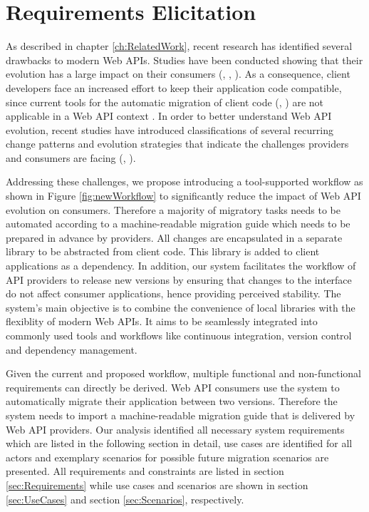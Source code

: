 \chapter{Requirements Elicitation}
\label{ch:RequirementsElicitation}

As described in chapter \ref{ch:RelatedWork}, recent research has identified several drawbacks to modern Web APIs. Studies have been conducted showing that their evolution has a large impact on their consumers (\cite{brito_you_2020}, \cite{xavier_historical_2017}, \cite{espinha_web_2014}). As a consequence, client developers face an increased effort to keep their application code compatible, since current tools for the automatic migration of client code (\cite{henkel_catchup!_2005}, \cite{hutchison_automated_2006}) are not applicable in a Web API context \cite{li_how_2013}. In order to better understand Web API evolution, recent studies have introduced classifications of several recurring change patterns and evolution strategies that indicate the challenges providers and consumers are facing (\cite{li_how_2013}, \cite{lubke_interface_2019}). 

Addressing these challenges, we propose introducing a tool-supported workflow as shown in Figure \ref{fig:newWorkflow} to significantly reduce the impact of Web API evolution on consumers. Therefore a majority of migratory tasks needs to be automated according to a machine-readable migration guide which needs to be prepared in advance by providers. All changes are encapsulated in a separate library to be abstracted from client code. This library is added to client applications as a dependency. In addition, our system facilitates the workflow of API providers to release new versions by ensuring that changes to the interface do not affect consumer applications, hence providing perceived stability. The system's main objective is to combine the convenience of local libraries with the flexiblity of modern Web APIs. It aims to be seamlessly integrated into commonly used tools and workflows like continuous integration, version control and dependency management. 

Given the current and proposed workflow, multiple functional and non-functional requirements can directly be derived. Web API consumers use the system to automatically migrate their application between two versions. Therefore the system needs to import a machine-readable migration guide that is delivered by Web API providers. Our analysis identified all necessary system requirements which are listed in the following section in detail, use cases are identified for all actors and exemplary scenarios for possible future migration scenarios are presented. All requirements and constraints are listed in section \ref{sec:Requirements} while use cases and scenarios are shown in section \ref{sec:UseCases} and section \ref{sec:Scenarios}, respectively.
\newpage


